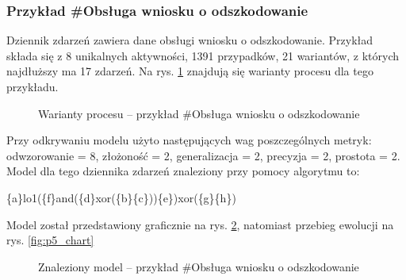 \subsubsection{Przykład \#Obsługa wniosku o odszkodowanie}
\label{sec:example5}
Dziennik zdarzeń zawiera dane obsługi wniosku o odszkodowanie.
Przykład składa się z 8 unikalnych aktywności, 1391 przypadków, 21 wariantów, z których najdłuższy ma 17 zdarzeń. Na rys. \ref{fig:p5_variants} znajdują się warianty procesu dla tego przykładu.

\begin{figure}[H]
	\caption{\label{fig:p5_variants}Warianty procesu -- przykład \#Obsługa wniosku o odszkodowanie}
\end{figure}

Przy odkrywaniu modelu użyto następujących wag poszczególnych metryk: odwzorowanie = 8, złożoność = 2, generalizacja = 2, precyzja = 2, prostota = 2. Model dla tego dziennika zdarzeń znaleziony przy pomocy algorytmu to:
\begin{center}
	\{a\}lo1(\{f\}and(\{d\}xor(\{b\}\{c\}))\{e\})xor(\{g\}\{h\})
\end{center}
Model został przedstawiony graficznie na rys. \ref{fig:p5_model}, natomiast przebieg ewolucji na rys. \ref{fig:p5_chart}

\begin{figure}[H]
	\caption{\label{fig:p5_model}Znaleziony model -- przykład \#Obsługa wniosku o odszkodowanie}
\end{figure}

